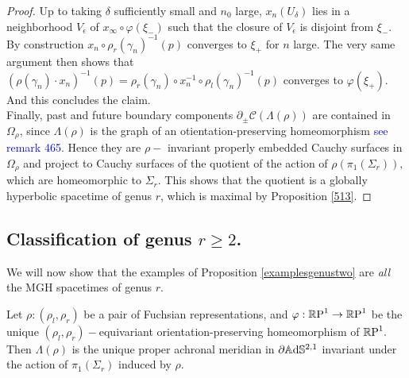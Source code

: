\begin{proof}
    Up to taking $\delta$ sufficiently small and $n_0$ large, $x_n(U_\delta)$ lies in a neighborhood $V_\epsilon$ of $x_\infty\circ\varphi(\xi_-)$ such that the closure of $V_\epsilon$ is disjoint from $\xi_-$. By construction $x_n\circ \rho_r(\gamma_n)^{-1}(p)$ converges to $\xi_+$ for $n$ large. The very same argument then shows that $(\rho(\gamma_n)\cdot x_n)^{-1}(p)=\rho_r(\gamma_n)\circ x_n^{-1}\circ\rho_l(\gamma_n)^{-1}(p)$ converges to $\varphi(\xi_+)$. And this concludes the claim. \\
    Finally, past and future boundary components $\partial_\pm\mathcal{C}(\Lambda(\rho))$ are contained in $\Omega_{\rho}$, since $\Lambda(\rho)$ is the graph of an otientation-preserving homeomorphism \textcolor{blue}{see remark 465}. Hence they are $\rho-$ invariant properly embedded Cauchy surfaces in $\Omega_\rho$ and project to Cauchy surfaces of the quotient of the action of $\rho(\pi_1(\Sigma_r)),$ which are homeomorphic to $\Sigma_r$. This shows that the quotient is a globally hyperbolic spacetime of genus $r$, which is maximal by Proposition \ref{513}.
\end{proof}

\subsection{Classification of genus $r\geq 2$.} We will now show that the examples of Proposition \ref{examplesgenustwo} are \textit{all} the MGH spacetimes of genus $r$. 

\begin{lemma}
    Let $\rho:(\rho_l,\rho_r)$ be a pair of Fuchsian representations, and $\varphi:\mathbb{R}\text{P}^1\to\mathbb{R}\text{P}^1$ be the unique $(\rho_l,\rho_r)-$equivariant orientation-preserving homeomorphism of $\mathbb{R}\text{P}^1.$ Then $\Lambda(\rho)$ is the unique proper achronal meridian in $\partial\mathbb{A}\mathrm{d}\mathbb{S}^{2,1}$ invariant under the action of $\pi_1(\Sigma_r)$ induced by $\rho.$
\end{lemma}

